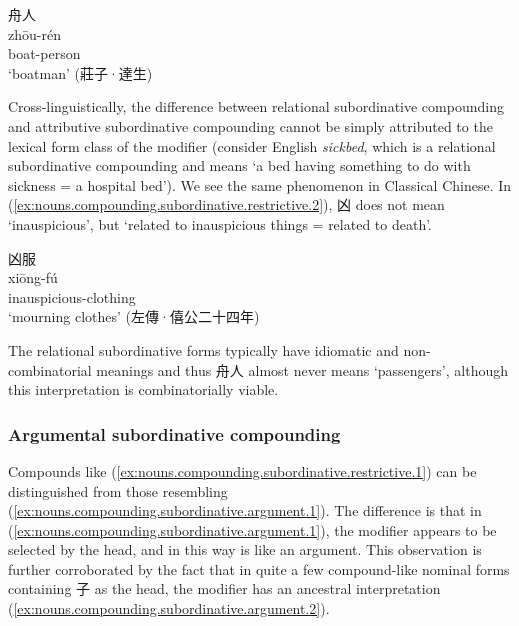 \documentclass[UTF8, a4paper, oneside, scheme=plain, 12pt]{ctexrep}
\newcommand{\form}[1]{\emph{#1}}
\newcommand{\translate}[1]{`#1'}
\begin{document}
\begin{exe}
    \ex\label{ex:nouns.compounding.subordinative.restrictive.1}
    \glll 舟人 \\
    zhōu-rén \\
    boat-person \\
    \glt\translate{boatman} \hfill (莊子·達生)
\end{exe}

Cross-linguistically, the difference between relational subordinative compounding and attributive subordinative compounding cannot be simply attributed to the lexical form class of the modifier
(consider English \form{sickbed}, which is a relational subordinative compounding and means \translate{a bed having something to do with sickness = a hospital bed}).
We see the same phenomenon in Classical Chinese.
In (\ref{ex:nouns.compounding.subordinative.restrictive.2}),
凶 does not mean \translate{inauspicious}, but \translate{related to inauspicious things = related to death}.

\begin{exe}
    \ex\label{ex:nouns.compounding.subordinative.restrictive.2}
    \glll 凶服 \\
    xiōng-fú \\
    inauspicious-clothing \\
    \glt\translate{mourning clothes} \hfill (左傳·僖公二十四年)
\end{exe}

The relational subordinative forms typically have idiomatic and non-combinatorial meanings 
and thus 舟人 almost never means \translate{passengers},
although this interpretation is combinatorially viable.

\subsubsection{Argumental subordinative compounding}

Compounds like (\ref{ex:nouns.compounding.subordinative.restrictive.1}) can be distinguished from those resembling (\ref{ex:nouns.compounding.subordinative.argument.1}).
The difference is that in (\ref{ex:nouns.compounding.subordinative.argument.1}),
the modifier appears to be selected by the head,
and in this way is like an argument.
This observation is further corroborated by the fact that 
in quite a few compound-like nominal forms containing 子 as the head,
the modifier has an ancestral interpretation (\ref{ex:nouns.compounding.subordinative.argument.2}).
\end{document}
